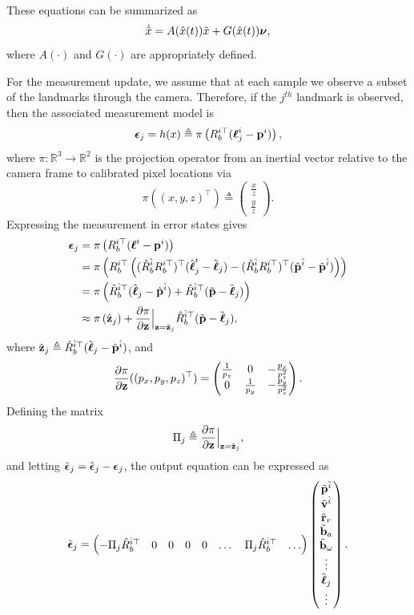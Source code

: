 These equations can be summarized as
\[
\dot{\tilde{x}} = A(\hat{x}(t))\tilde{x} + G(\hat{x}(t))\boldsymbol{\nu},
\]
where $A(\cdot)$ and $G(\cdot)$ are appropriately defined.

For the measurement update, we assume that at each sample we observe a subset of the landmarks through the camera.  Therefore, if the $j^{th}$ landmark is observed, then the associated measurement model is
\[
\boldsymbol{\epsilon}_j = h(x) \triangleq \pi\left(R_b^{i\top} (\boldsymbol{\ell}_j^i - \mathbf{p}^i)\right),
\]
where $\pi:\mathbb{R}^3\to\mathbb{R}^2$ is the projection operator from an inertial vector relative to the camera frame to calibrated pixel locations via
\[
\pi((x, y, z)^\top) \triangleq \begin{pmatrix} \frac{x}{z} \\ \frac{y}{z} \end{pmatrix}.
\]
Expressing the measurement in error states gives
\begin{align*}
    \boldsymbol{\epsilon}_j &= \pi\left(R_b^{i\top} (\boldsymbol{\ell}^i - \mathbf{p}^i)\right) \\
      &= \pi\left(R_b^{i\top} \left( (\hat{R}_b^{\hat{i}} R_b^{i\top})^\top (\hat{\boldsymbol{\ell}}_j^i - \tilde{\boldsymbol{\ell}}_j) - (\hat{R}_b^{\hat{i}} R_b^{i\top})^\top (\hat{\mathbf{p}}^{\hat{i}} - \tilde{\mathbf{p}}^{\hat{i}})\right) \right) \\
      &= \pi\left(\hat{R}_b^{\hat{i}\top} (\hat{\boldsymbol{\ell}}_j - \hat{\mathbf{p}}^{\hat{i}}) + \hat{R}_b^{\hat{i}\top} (\tilde{\mathbf{p}}-\tilde{\boldsymbol{\ell}}_j) \right) \\
      &\approx \pi\left(\hat{\mathbf{z}}_j\right) + \frac{\partial\pi}{\partial \mathbf{z}}\Big|_{\mathbf{z}=\hat{\mathbf{z}}_j} \hat{R}_b^{\hat{i}\top} (\tilde{\mathbf{p}}-\tilde{\boldsymbol{\ell}}_j) ,
\end{align*}
where $\hat{\mathbf{z}}_j \triangleq \hat{R}_b^{\hat{i}\top} (\hat{\boldsymbol{\ell}}_j - \hat{\mathbf{p}}^{\hat{i}})$, and
\[
\frac{\partial\pi}{\partial\mathbf{z}}((p_x, p_y, p_z)^\top) = \begin{pmatrix} \frac{1}{p_z} & 0 & -\frac{p_x}{p_z^2} \\ 0 & \frac{1}{p_y} & -\frac{p_y}{p_z^2} \end{pmatrix}.
\]
Defining the matrix
\[
\Pi_j \triangleq \frac{\partial\pi}{\partial \mathbf{z}}\Big|_{\mathbf{z}=\hat{\mathbf{z}}_j},
\]
and letting $\tilde{\boldsymbol{\epsilon}}_j = \hat{\boldsymbol{\epsilon}}_j - \boldsymbol{\epsilon}_j$, 
the output equation can be expressed as
\[
\tilde{\boldsymbol{\epsilon}}_j 
    = \begin{pmatrix} 
    	-\Pi_j \hat{R}_b^{\hat{i}\top} & 0 & 0 & 0 & 0 & \dots & \Pi_j\hat{R}_b^{\hat{i}\top} & \dots 
      \end{pmatrix}
      \begin{pmatrix} 
      	\tilde{\mathbf{p}}^{\hat{i}} \\ 
      	\tilde{\mathbf{v}}^{\hat{i}} \\ 
      	\tilde{\mathbf{r}}_r \\ 
      	\tilde{\mathbf{b}}_a \\ 
      	\tilde{\mathbf{b}}_\omega \\ 
      	\vdots \\
      	\tilde{\boldsymbol{\ell}}_j \\ 
      	\vdots 
      \end{pmatrix}.
\]



